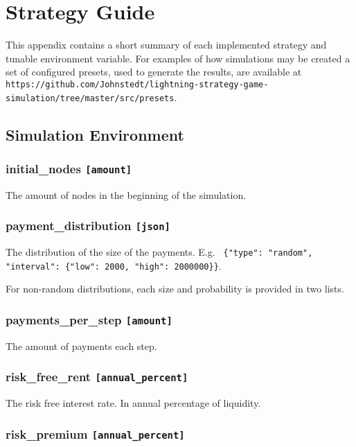 \chapter{Strategy Guide}
\label{chapter:strategies}

This appendix contains a short summary of each implemented strategy and tunable environment variable. For examples of how simulations may be created a set of configured presets, used to generate the results, are available at \texttt{https://github.com/Johnstedt/lightning-strategy-game-simulation/tree/master/src/presets}.

\section{Simulation Environment}

\subsection*{initial\_nodes \texttt{[amount]}}

The amount of nodes in the beginning of the simulation.

\subsection*{payment\_distribution \texttt{[json]} }

The distribution of the size of the payments. E.g. \texttt{ \{"type": "random", "interval": \{"low": 2000, "high": 2000000\}\}}.

For non-random distributions, each size and probability is provided in two lists. 

\subsection*{payments\_per\_step \texttt{[amount]}}

The amount of payments each step.

\subsection*{risk\_free\_rent \texttt{[annual\_percent]}}

The risk free interest rate. In annual percentage of liquidity. 

\subsection*{risk\_premium \texttt{[annual\_percent]}}

